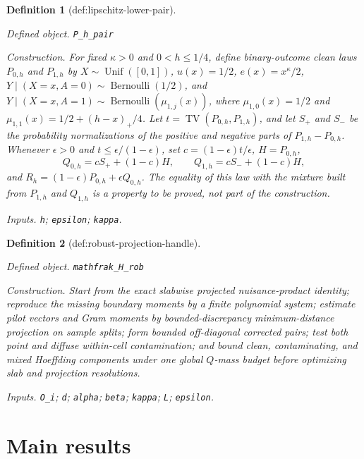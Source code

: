 \documentclass{article}
\newtheorem{definition}{Definition}
\begin{document}
\begin{definition}[def:lipschitz-lower-pair]\label{def:lipschitz-lower-pair}
\par\smallskip\noindent\emph{Defined object.} \texttt{P\_\allowbreak{}h\_\allowbreak{}pair}
\par\smallskip\noindent\emph{Construction.} For fixed \(\kappa>0\) and \(0<h\leq1/4\), define binary-outcome clean laws \(P_{0,h}\) and \(P_{1,h}\) by \(X\sim\operatorname{Unif}([0,1])\), \(u(x)=1/2\), \(e(x)=x^\kappa/2\), \(Y\mid(X=x,A=0)\sim\operatorname{Bernoulli}(1/2)\), and \(Y\mid(X=x,A=1)\sim\operatorname{Bernoulli}(\mu_{1,j}(x))\), where \(\mu_{1,0}(x)=1/2\) and \(\mu_{1,1}(x)=1/2+(h-x)_+/4\). Let \(t=\operatorname{TV}(P_{0,h},P_{1,h})\), and let \(S_+\) and \(S_-\) be the probability normalizations of the positive and negative parts of \(P_{1,h}-P_{0,h}\). Whenever \(\epsilon>0\) and \(t\leq\epsilon/(1-\epsilon)\), set \(c=(1-\epsilon)t/\epsilon\), \(H=P_{0,h}\),
\[
Q_{0,h}=cS_++(1-c)H,
\qquad
Q_{1,h}=cS_-+(1-c)H,
\]
and \(R_h=(1-\epsilon)P_{0,h}+\epsilon Q_{0,h}\). The equality of this law with the mixture built from \(P_{1,h}\) and \(Q_{1,h}\) is a property to be proved, not part of the construction.
\par\smallskip\noindent\emph{Inputs.} \texttt{h}; \texttt{epsilon}; \texttt{kappa}.
\end{definition}

\begin{definition}[def:robust-projection-handle]\label{def:robust-projection-handle}
\par\smallskip\noindent\emph{Defined object.} \texttt{mathfrak\_\allowbreak{}H\_\allowbreak{}rob}
\par\smallskip\noindent\emph{Construction.} Start from the exact slabwise projected nuisance-product identity; reproduce the missing boundary moments by a finite polynomial system; estimate pilot vectors and Gram moments by bounded-discrepancy minimum-distance projection on sample splits; form bounded off-diagonal corrected pairs; test both point and diffuse within-cell contamination; and bound clean, contaminating, and mixed Hoeffding components under one global \(Q\)-mass budget before optimizing slab and projection resolutions.
\par\smallskip\noindent\emph{Inputs.} \texttt{O\_\allowbreak{}i}; \texttt{d}; \texttt{alpha}; \texttt{beta}; \texttt{kappa}; \texttt{L}; \texttt{epsilon}.
\end{definition}

\section{Main results}
\end{document}
